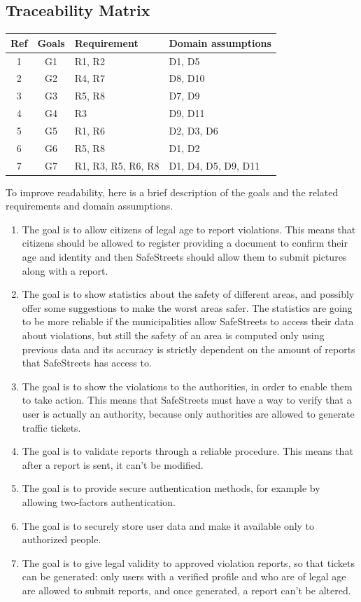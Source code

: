 \subsection{Traceability Matrix}
\begin{center}
    \begin{tabular}{c|c|l|l}
        \hline
        \textbf{Ref} & \textbf{Goals} & \textbf{Requirement} & \textbf{Domain assumptions} \\
        \hline
        1 & G1 & R1, R2 & D1, D5 \\
        \hline
        2 & G2 & R4, R7 & D8, D10 \\
        \hline
        3 & G3 & R5, R8 & D7, D9 \\
        \hline
        4 & G4 & R3 & D9, D11 \\
        \hline
        5 & G5 & R1, R6 & D2, D3, D6 \\
        \hline
        6 & G6 & R5, R8 & D1, D2 \\
        \hline
        7 & G7 & R1, R3, R5, R6, R8 & D1, D4, D5, D9, D11  \\
        \hline
    \end{tabular}
\end{center}
To improve readability, here is a brief description of the goals and the related requirements and domain assumptions. 
\begin{enumerate}
    \item The goal is to allow citizens of legal age to report violations. This means that citizens should be allowed to register providing a document to confirm their age and identity and then SafeStreets should allow them to submit pictures along with a report.
    \item The goal is to show statistics about the safety of different areas, and possibly offer some suggestions to make the worst areas safer. The statistics are going to be more reliable if the municipalities allow SafeStreets to access their data about violations, but still the safety of an area is computed only using previous data and its accuracy is strictly dependent on the amount of reports that SafeStreets has access to.
    \item The goal is to show the violations to the authorities, in order to enable them to take action. This means that SafeStreets must have a way to verify that a user is actually an authority, because only authorities are allowed to generate traffic tickets.
    \item The goal is to validate reports through a reliable procedure. This means that after a report is sent, it can't be modified.
    \item The goal is to provide secure authentication methods, for example by allowing two-factors authentication.
    \item The goal is to securely store user data and make it available only to authorized people.
    \item The goal is to give legal validity to approved violation reports, so that tickets can be generated: only users with a verified profile and who are of legal age are allowed to submit reports, and once generated, a report can't be altered.
\end{enumerate}
